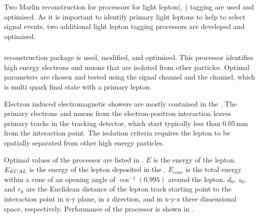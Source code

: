 Two Marlin reconstruction for processors for light lepton(\Pe, \Pmu) tagging are used and optimised. As it is important to identify primary light leptons to help to select signal events, two additional light lepton tagging processors are developed and optimised.


\subsubsection{\IsolatedLeptonFinderProcessor}
\label{sec:doubleHiggsIsolatedLeptonFinder}
\IsolatedLeptonFinderProcessor reconstruction package is used, modified, and optimised. This processor identifies high energy electrons and muons that are isolated from other particles. Optimal parameters are chosen and tested using the signal channel and the \eeTo{ \Pquark \Pquark \Pquark \Pquark \Plepton \Pnu} channel, which is multi quark final state with a primary lepton.

Electron induced electromagnetic showers are mostly contained in the \ECAL. The primary electrons and muons from the electron-positron interaction leaves primary tracks in the tracking detector, which start typically less than 0.05\,mm from the interaction point. The isolation criteria requires the lepton to be spatially separated from other high energy particles.

Optimal values of the processor are listed in . $E$ is the energy of the lepton. $E_{ECAL}$ is the energy of the lepton deposited in the \ECAL. $E_{cone}$ is the total energy within a cone of an opening angle of $\cos^{-1}(0.995)$ around the lepton. $d_0$, $z_0$, and $r_0$ are the Euclidean distance of the lepton track starting point to the interaction point in x-y plane, in z direction, and in x-y-z three dimensional space, respectively. Performance of the processor is shown in .

